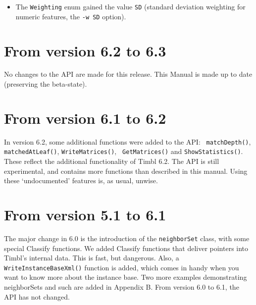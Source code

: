 \documentclass{report}
\begin{document}
\begin{itemize}
\begin{itemize}
  \item {\tt WriteInstanceBaseLevels()} dumps only the top levels of
    the instance base;
  \item {\tt Expand()} and {\tt Remove()} add or remove instances
    from a file to/from a trained instance base;
  \item {\tt lastHandledInstance()}, {\tt myTargets()}, {\tt
    getInputFormat()}, {\tt isValid()}, {\tt initExperiment()} and
    {\tt BuildInfo()} give access to more of TiMBL's internal state;
  \item a constructor taking a pre-parsed {\tt TiCC::CL\_Options}
    object was added next to the string-based constructor.
  \end{itemize}
\item The {\tt Weighting} enum gained the value {\tt SD} (standard
  deviation weighting for numeric features, the {\tt -w SD} option).
\end{itemize}

\section{From version 6.2 to 6.3}

No changes to the API are made for this release. This Manual is made
up to date (preserving the beta-state).

\section{From version 6.1 to 6.2}

In version 6.2, some additional functions were added to the API: {\tt
  matchDepth()}, {\tt matchedAtLeaf()}, {\tt WriteMatrices()}, {\tt
  GetMatrices()} and {\tt ShowStatistics()}. These reflect the
additional functionality of Timbl 6.2.  The API is still experimental,
and contains more functions than described in this manual. Using these
`undocumented' features is, as usual, unwise.

\section{From version 5.1 to 6.1}

The major change in 6.0 is the introduction of the {\tt neighborSet}
class, with some special Classify functions.  We added Classify
functions that deliver pointers into Timbl's internal data. This is
fast, but dangerous.  Also, a {\tt WriteInstanceBaseXml()} function is
added, which comes in handy when you want to know more about the
instance base.  Two more examples demonstrating neighborSets and such
are added in Appendix B. From version 6.0 to 6.1, the API has not changed.
\end{document}
